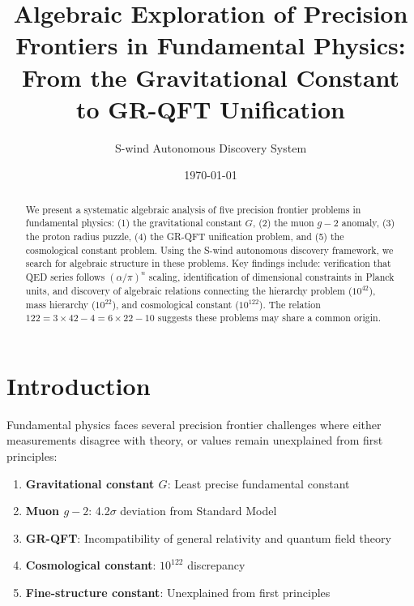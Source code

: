 \documentclass[twocolumn,prl,aps,superscriptaddress]{revtex4-2}
\begin{document}
\title{Algebraic Exploration of Precision Frontiers in Fundamental Physics:\\
From the Gravitational Constant to GR-QFT Unification}

\author{S-wind Autonomous Discovery System}

\date{\today}

\begin{abstract}
We present a systematic algebraic analysis of five precision frontier problems 
in fundamental physics: (1) the gravitational constant $G$, (2) the muon $g-2$ 
anomaly, (3) the proton radius puzzle, (4) the GR-QFT unification problem, and 
(5) the cosmological constant problem. Using the S-wind autonomous discovery 
framework, we search for algebraic structure in these problems. Key findings 
include: verification that QED series follows $({\alpha}/{\pi})^n$ scaling, 
identification of dimensional constraints in Planck units, and discovery of 
algebraic relations connecting the hierarchy problem ($10^{42}$), mass hierarchy 
($10^{22}$), and cosmological constant ($10^{122}$). The relation 
$122 = 3 \times 42 - 4 = 6 \times 22 - 10$ suggests these problems may share 
a common origin.
\end{abstract}

\maketitle

\section{Introduction}

Fundamental physics faces several precision frontier challenges where either 
measurements disagree with theory, or values remain unexplained from first 
principles:

\begin{enumerate}
\item \textbf{Gravitational constant $G$}: Least precise fundamental constant
\item \textbf{Muon $g-2$}: 4.2$\sigma$ deviation from Standard Model
\item \textbf{GR-QFT}: Incompatibility of general relativity and quantum field theory
\item \textbf{Cosmological constant}: $10^{122}$ discrepancy
\item \textbf{Fine-structure constant}: Unexplained from first principles
\end{enumerate}
\end{document}
